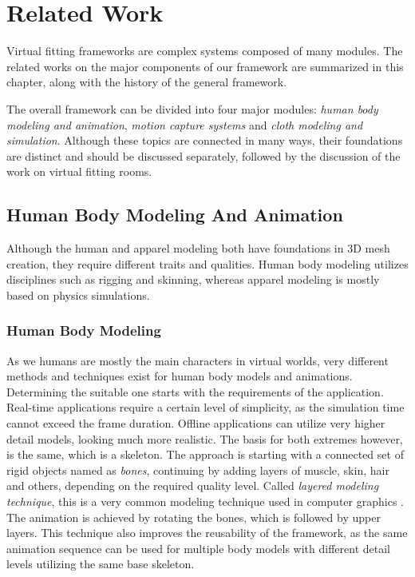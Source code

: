 \chapter{Related Work}
\label{chapter_related_work}

Virtual fitting frameworks are complex systems composed of many modules. The related works on the major components of our framework are summarized in this chapter, 
along with the history of the general framework. 

The overall framework can be divided into four major modules: \textit{human body modeling and animation}, \textit{motion capture systems} and 
\textit{cloth modeling and simulation}. Although these topics are connected in many ways, their foundations are distinct 
and should be discussed separately, followed by the discussion of the work on virtual fitting rooms.

\section{Human Body Modeling And Animation}
\label{section_related_modeling}

Although the human and apparel modeling both have foundations in 3D mesh creation, they require different traits and qualities. Human body modeling utilizes disciplines such as rigging and skinning, whereas apparel modeling is mostly based on physics simulations.

\subsection{Human Body Modeling}
As we humans are mostly the main characters in virtual worlds, very different methods and techniques exist for human body models and animations. Determining the suitable one 
starts with the requirements of the application. Real-time applications require a certain level of simplicity, as the simulation time cannot exceed the frame duration. Offline 
applications can utilize very higher detail models, looking much more realistic. The basis for both extremes however, is the same, which is a skeleton. The approach is starting 
with a connected set of rigid objects named as \textit{bones}, continuing by adding layers of muscle, skin, hair and others, depending on the required quality level. Called \textit{layered
modeling technique}, this is a very common modeling technique used in computer graphics \cite{Chadwick1989}. The animation is achieved by rotating the bones, which is followed by 
upper layers. This technique also improves the reusability of the framework, as the same animation sequence can be used for multiple body models with different detail levels utilizing the 
same base skeleton.   

